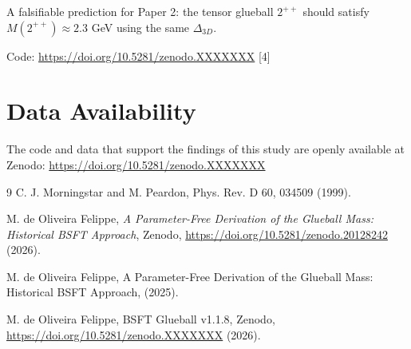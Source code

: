 \documentclass[prl,aps,reprint,groupedaddress]{revtex4-2}
\begin{document}
	A falsifiable prediction for Paper 2: the tensor glueball $2^{++}$ should satisfy $M(2^{++}) \approx 2.3$ GeV using the same $\Delta_{3D}$.
	
	Code: \url{https://doi.org/10.5281/zenodo.XXXXXXX} [4]
	
	\section*{Data Availability}
	The code and data that support the findings of this study are openly available at Zenodo: \url{https://doi.org/10.5281/zenodo.XXXXXXX}
	
	\begin{thebibliography}{9}
		 C. J. Morningstar and M. Peardon, Phys. Rev. D 60, 034509 (1999).
		
		 M. de Oliveira Felippe,
		\textit{A Parameter-Free Derivation of the Glueball Mass: Historical BSFT Approach},
		Zenodo, \url{https://doi.org/10.5281/zenodo.20128242} (2026).
		
		 M. de Oliveira Felippe,
		A Parameter-Free Derivation of the Glueball Mass: Historical BSFT Approach, (2025).
		
		 M. de Oliveira Felippe,
		BSFT Glueball v1.1.8, Zenodo,
		\url{https://doi.org/10.5281/zenodo.XXXXXXX} (2026).
	\end{thebibliography}
	
\end{document}
